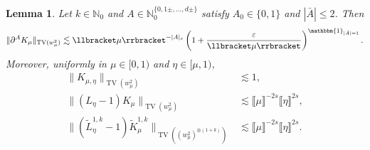 \documentclass{article}
\numberwithin{equation}{section}
\theoremstyle{plain}
\newtheorem{lemma}[theorem]{Lemma}
\theoremstyle{definition}
\begin{document}
\begin{lemma}
	\label{lem:K-kernel}
	Let \(k\in\mathbb N_0\) and
	\(A\in\mathbb N_0^{\{0,1\pm,\ldots,d\pm\}}\) satisfy
	\(A_0\in\{0,1\}\) and \(|\bar A|\leq2\).  Then
	\begin{equation}
		\label{eq:K-kernel-corrected-derivative}
		\|\partial^AK_\mu\|_{\operatorname{TV}(w_\mu^2)}
		\lesssim
		\llbracket\mu\rrbracket^{-|A|_s}
		\left(
		1+\frac{\varepsilon}{\llbracket\mu\rrbracket}
		\right)^{\mathbbm{1}_{|\bar A|=1}}.
	\end{equation}
	Moreover, uniformly in
	\(\mu\in[0,1)\) and \(\eta\in[\mu,1)\),
	\begin{align}
		\|K_{\mu,\eta}\|_{\operatorname{TV}(w_\mu^2)}
		&\lesssim1,
		\label{eq:K-kernel-cross-corrected}
		\\
		\|(L_\eta-1)K_\mu\|_{\operatorname{TV}(w_\mu^2)}
		&\lesssim
		\llbracket\mu\rrbracket^{-2s}
		\llbracket\eta\rrbracket^{2s},
		\label{eq:K-kernel-Lminus1-corrected}
		\\
		\|(\tilde L_\eta^{1,k}-1)\tilde K_\mu^{1,k}\|
		_{\operatorname{TV}((w_\mu^2)^{\otimes(1+k)})}
		&\lesssim
		\llbracket\mu\rrbracket^{-2s}
		\llbracket\eta\rrbracket^{2s}.
		\label{eq:K-kernel-tensor-corrected}
	\end{align}
\end{lemma}
\end{document}
